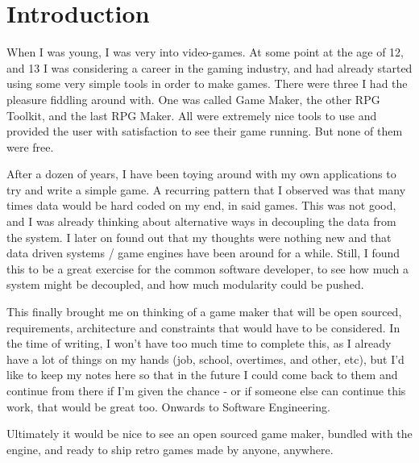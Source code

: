 \section{Introduction}

When I was young, I was very into video-games. At some point at the age of 12,
and 13 I was considering a career in the gaming industry, and had already
started using some very simple tools in order to make games. There were three
I had the pleasure fiddling around with. One was called Game Maker, the other 
RPG Toolkit, and the last RPG Maker. All were extremely nice tools to use and 
provided the user with satisfaction to see their game running. But none of them
were free. 

After a dozen of years, I have been toying around with my own applications to 
try and write a simple game. A recurring pattern that I observed was that many
times data would be hard coded on my end, in said games. This was not good, and
I was already thinking about alternative ways in decoupling the data from the
system. I later on found out that my thoughts were nothing new and that data 
driven systems / game engines have been around for a while. Still, I found this
to be a great exercise for the common software developer, to see how much a 
system might be decoupled, and how much modularity could be pushed. 

This finally brought me on thinking of a game maker that will be open sourced,
requirements, architecture and constraints that would have to be considered. In
the time of writing, I won't have too much time to complete this, as I already
have a lot of things on my hands (job, school, overtimes, and other, etc), but
I'd like to keep my notes here so that in the future I could come back to them
and continue from there if I'm given the chance - or if someone else can
continue this work, that would be great too. Onwards to Software Engineering.

Ultimately it would be nice to see an open sourced game maker, bundled with the
engine, and ready to ship retro games made by anyone, anywhere.

